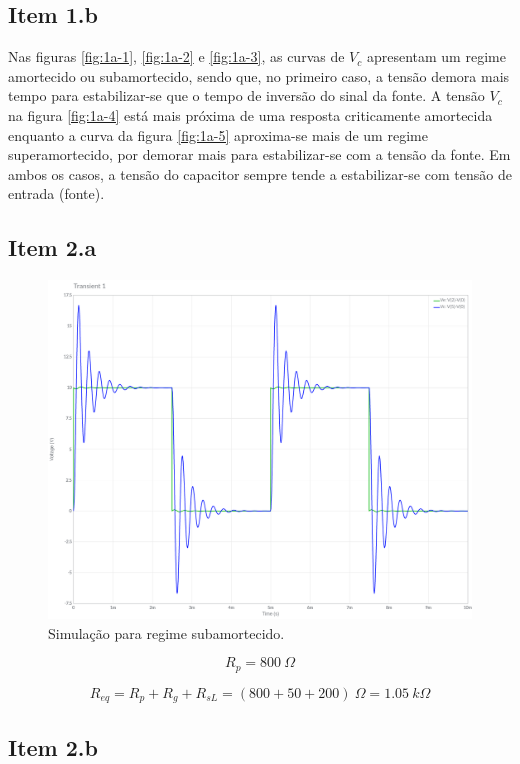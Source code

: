 \documentclass[11pt]{article}
\begin{document}
\subsection*{Item 1.b}

Nas figuras \ref{fig:1a-1}, \ref{fig:1a-2} e \ref{fig:1a-3}, as curvas de $V_{c}$ apresentam um regime amortecido ou subamortecido, sendo que, no primeiro caso, a tensão demora mais tempo para estabilizar-se que o tempo de inversão do sinal da fonte. A tensão $V_{c}$ na figura \ref{fig:1a-4} está mais próxima de uma resposta criticamente amortecida enquanto a curva da figura \ref{fig:1a-5} aproxima-se mais de um regime superamortecido, por demorar mais para estabilizar-se com a tensão da fonte. Em ambos os casos, a tensão do capacitor sempre tende a estabilizar-se com tensão de entrada (fonte).

\subsection*{Item 2.a}

\begin{figure}[h!]
  \centering
  \includegraphics[width=.75\textwidth]{fig/2a}
  \caption{Simulação para regime subamortecido.}
  \label{fig:2a}
\end{figure}

$$
  R_{p} = 800\ \Omega
$$

$$
  R_{eq} = R_{p} + R_{g} + R_{sL} = (800 + 50 + 200)\ \Omega = 1.05\ k\Omega
$$

\subsection*{Item 2.b}
\end{document}
